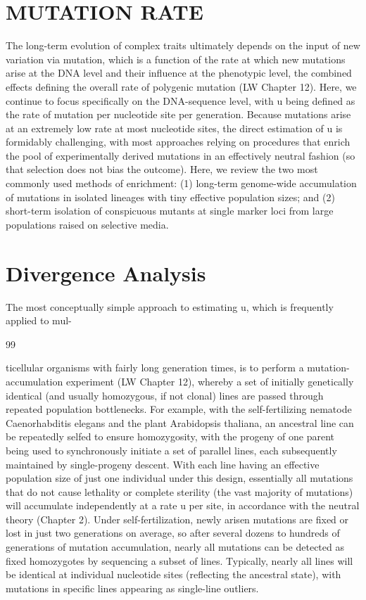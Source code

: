 \documentclass{article}
\begin{document}
\section{MUTATION RATE}
The long-term evolution of complex traits ultimately depends on the input of new variation via mutation, which is a function of the rate at which new mutations arise at the DNA level and their influence at the phenotypic level, the combined effects defining the overall rate of polygenic mutation (LW Chapter 12). Here, we continue to focus specifically on the DNA-sequence level, with u being defined as the rate of mutation per nucleotide site per generation. Because mutations arise at an extremely low rate at most nucleotide sites, the direct estimation of u is formidably challenging, with most approaches relying on procedures that enrich the pool of experimentally derived mutations in an effectively neutral fashion (so that selection does not bias the outcome). Here, we review the two most commonly used methods of enrichment: (1) long-term genome-wide accumulation of mutations in isolated lineages with tiny effective population sizes; and (2) short-term isolation of conspicuous mutants at single marker loci from large populations raised on selective media.

\section{Divergence Analysis}
The most conceptually simple approach to estimating u, which is frequently applied to mul-

99

ticellular organisms with fairly long generation times, is to perform a mutation-accumulation experiment (LW Chapter 12), whereby a set of initially genetically identical (and usually homozygous, if not clonal) lines are passed through repeated population bottlenecks. For example, with the self-fertilizing nematode Caenorhabditis elegans and the plant Arabidopsis thaliana, an ancestral line can be repeatedly selfed to ensure homozygosity, with the progeny of one parent being used to synchronously initiate a set of parallel lines, each subsequently maintained by single-progeny descent. With each line having an effective population size of just one individual under this design, essentially all mutations that do not cause lethality or complete sterility (the vast majority of mutations) will accumulate independently at a rate u per site, in accordance with the neutral theory (Chapter 2). Under self-fertilization, newly arisen mutations are fixed or lost in just two generations on average, so after several dozens to hundreds of generations of mutation accumulation, nearly all mutations can be detected as fixed homozygotes by sequencing a subset of lines. Typically, nearly all lines will be identical at individual nucleotide sites (reflecting the ancestral state), with mutations in specific lines appearing as single-line outliers.
\end{document}
